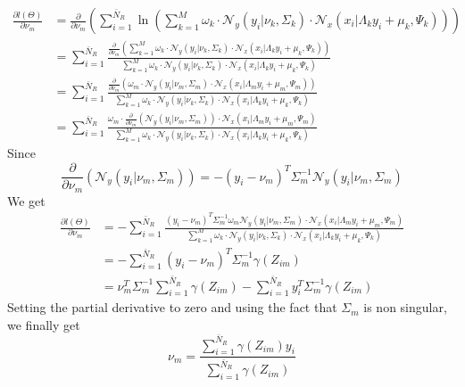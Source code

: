 \begin{align}
\frac{\partial l(\Theta)   }{\partial  \nu_m } &=\frac{\partial }{\partial \nu_m}\left( \sum\limits_{i = 1}^{\bar{N}_R}\ln\left(\sum\limits_{k = 1}^{M}\omega_k\cdot
\mathcal{N}_y\left(y_i\vert\nu_k,\Sigma_k\right)\cdot\mathcal{N}_x\left(x_i\vert\Lambda_ky_i + \mu_k,\Psi_k\right)\right)\right)\\
&= \sum\limits_{i = 1}^{\bar{N}_R}
\frac{\frac{\partial }{\partial \nu_m}\left(\sum\limits_{k = 1}^{M}\omega_k\cdot
\mathcal{N}_y\left(y_i\vert\nu_k,\Sigma_k\right)\cdot\mathcal{N}_x\left(x_i\vert\Lambda_ky_i + \mu_k,\Psi_k\right)\right)}{\sum\limits_{k = 1}^{M}\omega_k\cdot
\mathcal{N}_y\left(y_i\vert\nu_k,\Sigma_k\right)\cdot\mathcal{N}_x\left(x_i\vert\Lambda_ky_i + \mu_k,\Psi_k\right) }\\
&= \sum\limits_{i = 1}^{\bar{N}_R}
\frac{\frac{\partial }{\partial \nu_m}\left(\omega_m\cdot
\mathcal{N}_y\left(y_i\vert\nu_m,\Sigma_m\right)\cdot\mathcal{N}_x\left(x_i\vert\Lambda_my_i + \mu_m,\Psi_m\right)\right)}{\sum\limits_{k = 1}^{M}\omega_k\cdot
\mathcal{N}_y\left(y_i\vert\nu_k,\Sigma_k\right)\cdot\mathcal{N}_x\left(x_i\vert\Lambda_ky_i + \mu_k,\Psi_k\right) }\\
&= \sum\limits_{i = 1}^{\bar{N}_R}
\frac{\omega_m\cdot
\frac{\partial }{\partial \nu_m}\left(\mathcal{N}_y\left(y_i\vert\nu_m,\Sigma_m\right)\right)\cdot\mathcal{N}_x\left(x_i\vert\Lambda_my_i + \mu_m,\Psi_m\right)}{\sum\limits_{k = 1}^{M}\omega_k\cdot
\mathcal{N}_y\left(y_i\vert\nu_k,\Sigma_k\right)\cdot\mathcal{N}_x\left(x_i\vert\Lambda_ky_i + \mu_k,\Psi_k\right) }
\end{align}
Since
\begin{equation}
\frac{\partial }{\partial \nu_m}\left(\mathcal{N}_y\left(y_i\vert\nu_m,\Sigma_m\right)\right) = -\left(y_i - \nu_m\right)^T\Sigma_m^{-1}\mathcal{N}_y\left(y_i\vert\nu_m,\Sigma_m\right)
\end{equation}
We get
\begin{align}
\frac{\partial l(\Theta)   }{\partial  \nu_m } & = - \sum\limits_{i = 1}^{\bar{N}_R}
\frac{\left(y_i - \nu_m\right)^T\Sigma_m^{-1}
\omega_m \mathcal{N}_y\left(y_i\vert\nu_m,\Sigma_m\right)\cdot\mathcal{N}_x\left(x_i\vert\Lambda_my_i + \mu_m,\Psi_m\right)}{\sum\limits_{k = 1}^{M}\omega_k\cdot
\mathcal{N}_y\left(y_i\vert\nu_k,\Sigma_k\right)\cdot\mathcal{N}_x\left(x_i\vert\Lambda_ky_i + \mu_k,\Psi_k\right) }\\
&=- \sum\limits_{i = 1}^{\bar{N}_R}
\left(y_i - \nu_m\right)^T\Sigma_m^{-1}\gamma\left(Z_{im}\right)\\
&=\nu_m^T\Sigma_m^{-1}\sum\limits_{i = 1}^{\bar{N}_R}\gamma\left(Z_{im}\right) - \sum\limits_{i = 1}^{\bar{N}_R}y_i^T\Sigma_m^{-1}\gamma\left(Z_{im}\right)
\end{align}
Setting the partial derivative to zero and using the fact that $\Sigma_m$ is non singular, we finally get
\begin{equation}
\boxed{
\nu_m = \frac{ \sum\limits_{i = 1}^{\bar{N}_R}\gamma\left(Z_{im}\right)y_i}{ \sum\limits_{i = 1}^{\bar{N}_R}\gamma\left(Z_{im}\right)}}
\end{equation}

